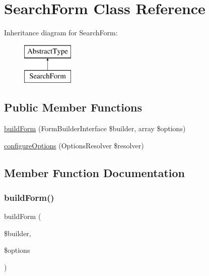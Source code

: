 \hypertarget{class_app_1_1_forms_1_1_search_form}{}\section{Search\+Form Class Reference}
\label{class_app_1_1_forms_1_1_search_form}
Inheritance diagram for Search\+Form\+:\begin{figure}[H]
\begin{center}
\leavevmode
\includegraphics[height=2.000000cm]{class_app_1_1_forms_1_1_search_form}
\end{center}
\end{figure}
\subsection*{Public Member Functions}
\begin{DoxyCompactItemize}
\item 
\mbox{\hyperlink{class_app_1_1_forms_1_1_search_form_a83c3745710374f9c5a1eb0686fe2dfab}{build\+Form}} (Form\+Builder\+Interface \$builder, array \$options)
\item 
\mbox{\hyperlink{class_app_1_1_forms_1_1_search_form_a8ff68a86f5090b5df973286836e46ead}{configure\+Options}} (Options\+Resolver \$resolver)
\end{DoxyCompactItemize}


\subsection{Member Function Documentation}
\mbox{\label{class_app_1_1_forms_1_1_search_form_a83c3745710374f9c5a1eb0686fe2dfab}} 
\subsubsection{\texorpdfstring{buildForm()}{buildForm()}}
{\footnotesize\ttfamily build\+Form (\begin{DoxyParamCaption}\item[{Form\+Builder\+Interface}]{\$builder,  }\item[{array}]{\$options }\end{DoxyParamCaption})}


